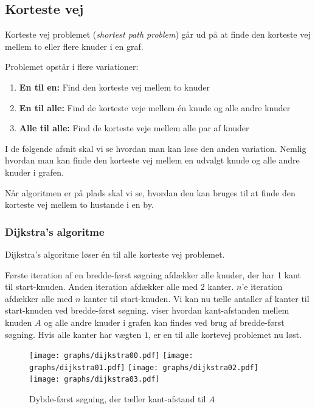 \documentclass[10pt,a4paper,danish]{article}
\begin{document}
\subsection{Korteste vej}
\label{sec:shortest_path}

Korteste vej problemet (\textit{shortest path problem}) går ud på at
finde den korteste vej mellem to eller flere knuder i en
graf.

Problemet opstår i flere variationer:

\begin{enumerate}
\item \textbf{En til en:} Find den korteste vej mellem to knuder
\item \textbf{En til alle:} Find de korteste veje mellem \'en knude og
  alle andre knuder
\item \textbf{Alle til alle:} Find de korteste veje mellem alle par af
  knuder
\end{enumerate}

I de følgende afsnit skal vi se hvordan man kan løse den anden
variation. Nemlig hvordan man kan finde den korteste vej mellem en
udvalgt knude og alle andre knuder i grafen.

Når algoritmen er på plads skal vi se, hvordan den kan bruges til at
finde den korteste vej mellem to hustande i en by.


\subsubsection{Dijkstra's algoritme}

Dijkstra's algoritme løser \'en til alle korteste vej
problemet.

Første iteration af en bredde-først søgning afdækker alle knuder, der
har 1 kant til start-knuden. Anden iteration afdækker alle med 2
kanter. $n$'e iteration afdækker alle med $n$ kanter til
start-knuden. Vi kan nu tælle antaller af kanter til start-knuden ved
bredde-først søgning.  viser hvordan
kant-afstanden mellem knuden $A$ og alle andre knuder i grafen kan
findes ved brug af bredde-først søgning. Hvis alle kanter har vægten
$1$, er en til alle kortevej problemet nu løst.

\begin{figure}[h]\centering
\texttt{[image: graphs/dijkstra00.pdf]}
\texttt{[image: graphs/dijkstra01.pdf]}
\texttt{[image: graphs/dijkstra02.pdf]}
\texttt{[image: graphs/dijkstra03.pdf]}
\caption{Dybde-først søgning, der tæller kant-afstand til $A$}
\label{fig:dijkstra0}
\end{figure}
\end{document}
